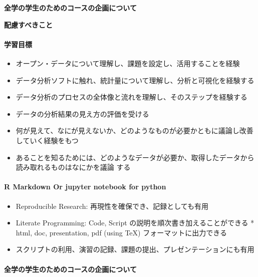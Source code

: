 \documentclass[
]{bxjsbook}
\providecommand{\tightlist}{%
  \setlength{\itemsep}{0pt}\setlength{\parskip}{0pt}}
\theoremstyle{definition}
\theoremstyle{definition}
\theoremstyle{definition}
\theoremstyle{definition}
\theoremstyle{remark}
\begin{document}
\textbf{全学の学生のためのコースの企画について}

\textbf{配慮すべきこと}

\hypertarget{ux5b66ux7fd2ux76eeux6a19}{%
\paragraph{学習目標}\label{ux5b66ux7fd2ux76eeux6a19}}

\begin{itemize}
\tightlist
\item
  オープン・データについて理解し、課題を設定し、活用することを経験
\item
  データ分析ソフトに触れ、統計量について理解し、分析と可視化を経験する
\item
  データ分析のプロセスの全体像と流れを理解し、そのステップを経験する
\item
  データの分析結果の見え方の評価を受ける
\item
  何が見えて、なにが見えないか、どのようなものが必要かともに議論し改善していく経験をもつ
\item
  あることを知るためには、どのようなデータが必要か、取得したデータから読み取れるものはなにかを議論 する
\end{itemize}

\hypertarget{r-markdown-or-jupyter-notebook-for-python}{%
\paragraph{R Markdown Or jupyter notebook for python}\label{r-markdown-or-jupyter-notebook-for-python}}

\begin{itemize}
\tightlist
\item
  Reproducible Research: 再現性を確保でき、記録としても有用
\item
  Literate Programming: Code, Script の説明を順次書き加えることができる * html, doc, presentation, pdf (using TeX) フォーマットに出力できる
\item
  スクリプトの利用、演習の記録、課題の提出、プレゼンテーションにも有用
\end{itemize}

\hypertarget{ux5168ux5b66ux306eux5b66ux751fux306eux305fux3081ux306eux30b3ux30fcux30b9ux306eux4f01ux753bux306bux3064ux3044ux3066}{%
\paragraph{全学の学生のためのコースの企画について}\label{ux5168ux5b66ux306eux5b66ux751fux306eux305fux3081ux306eux30b3ux30fcux30b9ux306eux4f01ux753bux306bux3064ux3044ux3066}}
\end{document}
